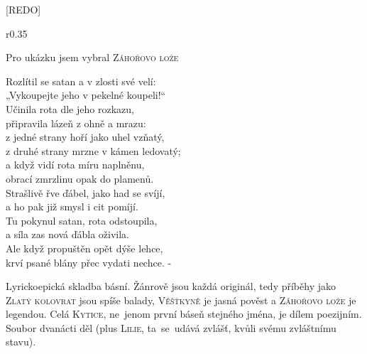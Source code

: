 \documentclass{extarticle} %
\begin{document}
\newpage


\changefontsize{7pt}

[REDO]

\noindent\begin{wrapfigure}{r}{0.35\textwidth}
\tiny

\setlength{\parindent}{3pt}
Pro ukázku jsem vybral \textsc{Záhořovo lože}
\begin{center}
\noindent
Rozlítil se satan a v zlosti své velí: \\
„Vykoupejte jeho v pekelné koupeli!“ \\
Učinila rota dle jeho rozkazu, \\
připravila lázeň z ohně a mrazu: \\
z jedné strany hoří jako uhel vzňatý, \\
z druhé strany mrzne v kámen ledovatý; \\
a když vidí rota míru naplněnu, \\
obrací zmrzlinu opak do plamenů. \\
Strašlivě řve ďábel, jako had se svíjí, \\
a ho pak již smysl i cit pomíjí. \\
Tu pokynul satan, rota odstoupila, \\
a síla zas nová ďábla oživila. \\
Ale když propuštěn opět dýše lehce, \\
krví psané blány přec vydati nechce. -
\end{center}
\vspace{3em}
\end{wrapfigure}


\noindent 
Lyrickoepická skladba básní.
Žánrově jsou každá originál,
tedy příběhy jako \textsc{Zlatý kolovrat} jsou spíše balady,
\textsc{Věšťkyně} je jasná pověst
a \textsc{Záhořovo lože} je legendou.
Celá \textsc{Kytice}, ne~jenom první báseň stejného jména, je dílem poezijním.
Soubor dvanácti děl (plus \textsc{Lilie}, ta~se~udává zvlášť, kvůli svému zvláštnímu stavu).

\end{document}
